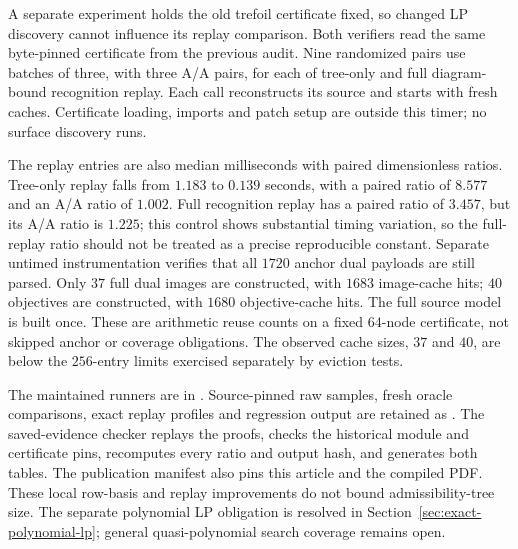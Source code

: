 A separate experiment holds the old trefoil certificate fixed, so changed
LP discovery cannot influence its replay comparison.  Both verifiers read
the same byte-pinned certificate from the previous audit.  Nine randomized
pairs use batches of three, with three A/A pairs, for each of tree-only and
full diagram-bound recognition replay.  Each call reconstructs its source
and starts with fresh caches.  Certificate loading, imports and patch setup
are outside this timer; no surface discovery runs.

\begin{center}
\small

\end{center}

The replay entries are also median milliseconds with paired dimensionless
ratios.  Tree-only replay falls from $1.183$ to $0.139$ seconds, with a
paired ratio of $8.577$ and an A/A ratio of $1.002$.  Full recognition replay
has a paired ratio of $3.457$, but its A/A ratio is $1.225$; this control
shows substantial timing variation, so the full-replay ratio should not be
treated as a precise reproducible constant.  Separate untimed
instrumentation verifies that all $1720$ anchor
dual payloads are still parsed.  Only $37$ full dual images are constructed,
with $1683$ image-cache hits; $40$ objectives are constructed, with $1680$
objective-cache hits.  The full source model is built once.  These are
arithmetic reuse counts on a fixed $64$-node certificate, not skipped anchor
or coverage obligations.  The observed cache sizes, $37$ and $40$, are below
the $256$-entry limits exercised separately by eviction tests.

The maintained runners are in .  Source-pinned
raw samples, fresh oracle comparisons, exact replay profiles and regression
output are retained as .  The saved-evidence checker
replays the proofs, checks the historical module and certificate pins,
recomputes every ratio and output hash, and generates both tables.  The
publication manifest also pins this article and the compiled PDF.  These
local row-basis and replay improvements do not bound admissibility-tree
size.  The separate polynomial LP obligation is resolved in
Section~\ref{sec:exact-polynomial-lp}; general quasi-polynomial search
coverage remains open.
